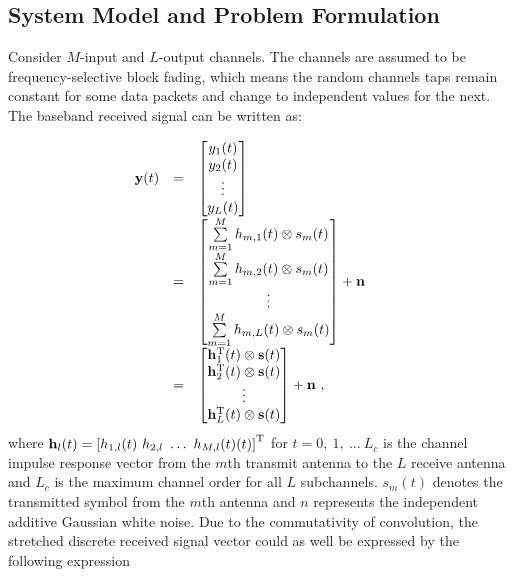 \documentclass[a4paper,10pt,fleqn, twocolumn]{IEEEtran}
\newcommand{\bh}{{\bf h}}
\newcommand{\bH}{{\bf H}}
\newcommand{\bs}{{\bf s}}
\newcommand{\bn}{{\bf n}}
\newcommand{\by}{{\bf y}}
\begin{document}
\subsection{System Model and Problem Formulation}
Consider $M$-input and $L$-output channels. The channels are
assumed to be frequency-selective block fading, which means the
random channels taps remain constant for some data packets and
change to independent values for the next. The baseband received
signal can be written as:


\begin{equation}\hspace{-0.20in}
\begin{array}{rcl}
\by(t)&=&\left[\begin{matrix}y_{1}(t)\\ y_{2}(t)\\ \vdots \\
y_{L}(t)\end{matrix}\right]\\
&=&\left[\begin{matrix}\sum\limits_{m=1}^{M}h_{m,1}(t)\otimes s_m(t)\\ \sum\limits_{m=1}^{M}h_{m,2}(t)\otimes s_m(t)\\ \vdots \\
\sum\limits_{m=1}^{M}h_{m,L}(t)\otimes
s_m(t)\end{matrix}\right]+\bn\\
&=&\left[\begin{matrix}\bh_{1}^{\rm T}(t)\otimes \bs(t)\\ \bh_{2}^{\rm T}(t)\otimes \bs(t)\\ \vdots \\
\bh_{L}^{\rm T}(t)\otimes \bs(t)\end{matrix}\right]+\bn\ ,
\end{array}
\end{equation}
\noindent where $\bh_{l}(t)=\left[h_{1,l}(t)\ h_{2,l}\ \ldots\
h_{M,l}(t)(t)\right]^{\rm T}$ for $t=0,\ 1,\ \ldots\ L_{c}$ is the
channel impulse response vector from the $m$th transmit antenna to
the $L$ receive antenna and $L_{c}$ is the maximum channel order
for all $L$ subchannels. $s_m(t)$ denotes the transmitted symbol
from the $m$th antenna and $n$ represents the independent additive
Gaussian white noise. Due to the commutativity of convolution, the
stretched discrete received signal vector could as well be
expressed by the following expression
\end{document}
